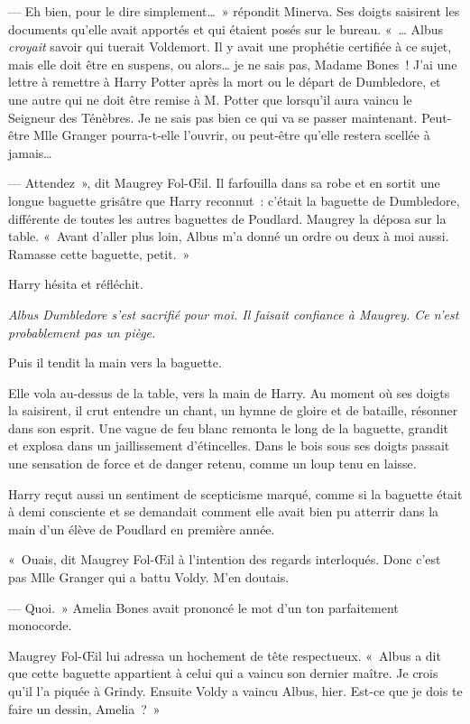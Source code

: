 --- Eh bien, pour le dire simplement…~» répondit Minerva. Ses doigts saisirent les documents qu'elle avait apportés et qui étaient posés sur le bureau. «~… Albus \emph{croyait} savoir qui tuerait Voldemort. Il y avait une prophétie certifiée à ce sujet, mais elle doit être en suspens, ou alors… je ne sais pas, Madame Bones~! J'ai une lettre à remettre à Harry Potter après la mort ou le départ de Dumbledore, et une autre qui ne doit être remise à M. Potter que lorsqu'il aura vaincu le Seigneur des Ténèbres. Je ne sais pas bien ce qui va se passer maintenant. Peut-être Mlle Granger pourra-t-elle l'ouvrir, ou peut-être qu'elle restera scellée à jamais…

--- Attendez~», dit Maugrey Fol-Œil. Il farfouilla dans sa robe et en sortit une longue baguette grisâtre que Harry reconnut~: c'était la baguette de Dumbledore, différente de toutes les autres baguettes de Poudlard. Maugrey la déposa sur la table. «~Avant d'aller plus loin, Albus m'a donné un ordre ou deux à moi aussi. Ramasse cette baguette, petit.~»

Harry hésita et réfléchit.

\emph{Albus Dumbledore s'est sacrifié pour moi. Il faisait confiance à Maugrey. Ce n'est probablement pas un piège.}

Puis il tendit la main vers la baguette.

Elle vola au-dessus de la table, vers la main de Harry. Au moment où ses doigts la saisirent, il crut entendre un chant, un hymne de gloire et de bataille, résonner dans son esprit. Une vague de feu blanc remonta le long de la baguette, grandit et explosa dans un jaillissement d'étincelles. Dans le bois sous ses doigts passait une sensation de force et de danger retenu, comme un loup tenu en laisse.

Harry reçut aussi un sentiment de scepticisme marqué, comme si la baguette était à demi consciente et se demandait comment elle avait bien pu atterrir dans la main d'un élève de Poudlard en première année.

«~Ouais, dit Maugrey Fol-Œil à l'intention des regards interloqués. Donc c'est pas Mlle Granger qui a battu Voldy. M'en doutais.

--- Quoi.~» Amelia Bones avait prononcé le mot d'un ton parfaitement monocorde.

Maugrey Fol-Œil lui adressa un hochement de tête respectueux. «~Albus a dit que cette baguette appartient à celui qui a vaincu son dernier maître. Je crois qu'il l'a piquée à Grindy. Ensuite Voldy a vaincu Albus, hier. Est-ce que je dois te faire un dessin, Amelia~?~»

